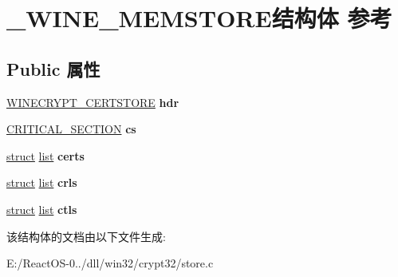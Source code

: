 \hypertarget{struct___w_i_n_e___m_e_m_s_t_o_r_e}{}\section{\+\_\+\+W\+I\+N\+E\+\_\+\+M\+E\+M\+S\+T\+O\+R\+E结构体 参考}
\label{struct___w_i_n_e___m_e_m_s_t_o_r_e}
\subsection*{Public 属性}
\begin{DoxyCompactItemize}
\item 
\mbox{\label{struct___w_i_n_e___m_e_m_s_t_o_r_e_ab5ec5773cf5efadbcf497604ab2a3faf}} 
\hyperlink{struct_w_i_n_e___c_r_y_p_t_c_e_r_t_s_t_o_r_e}{W\+I\+N\+E\+C\+R\+Y\+P\+T\+\_\+\+C\+E\+R\+T\+S\+T\+O\+RE} {\bfseries hdr}
\item 
\mbox{\label{struct___w_i_n_e___m_e_m_s_t_o_r_e_a761cd90224fae9539f4c3009d6051330}} 
\hyperlink{struct___c_r_i_t_i_c_a_l___s_e_c_t_i_o_n}{C\+R\+I\+T\+I\+C\+A\+L\+\_\+\+S\+E\+C\+T\+I\+ON} {\bfseries cs}
\item 
\mbox{\label{struct___w_i_n_e___m_e_m_s_t_o_r_e_a1fe9c0764519d0e197f97ae21f406cd3}} 
\hyperlink{interfacestruct}{struct} \hyperlink{classlist}{list} {\bfseries certs}
\item 
\mbox{\label{struct___w_i_n_e___m_e_m_s_t_o_r_e_adb3c5c36a4e43d7b962f709d8982b00c}} 
\hyperlink{interfacestruct}{struct} \hyperlink{classlist}{list} {\bfseries crls}
\item 
\mbox{\label{struct___w_i_n_e___m_e_m_s_t_o_r_e_a8642bb430de107fec5a0743fd58304de}} 
\hyperlink{interfacestruct}{struct} \hyperlink{classlist}{list} {\bfseries ctls}
\end{DoxyCompactItemize}


该结构体的文档由以下文件生成\+:\begin{DoxyCompactItemize}
\item 
E\+:/\+React\+O\+S-\/0../dll/win32/crypt32/store.\+c\end{DoxyCompactItemize}
